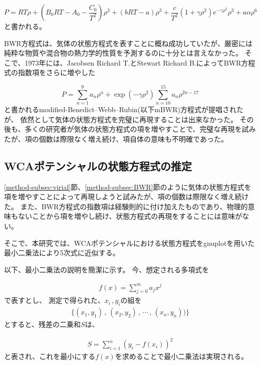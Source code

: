 \documentclass[titlepage]{jsreport}
\begin{document}
{{{\large
\begin{equation}
P=RT{\rho}+\left(B_0RT-A_0-{\frac{C_0}{T^2}}\right){\rho}^2+(bRT-a){\rho}^3+{\frac{c}{T^2}}(1+{\gamma}{\rho}^2)e^{-{\gamma}{\rho}^2}{\rho}^3+a{\alpha}{\rho}^6\label{eq:BWR}
\end{equation}
\normalsize
と書かれる。

BWR方程式は、気体の状態方程式を表すことに概ね成功していたが、厳密には純粋な物質や混合物の熱力学的性質を予測するのに十分とは言えなかった。
そこで、1973年には、Jacobsen Richard T.とStewart Richard B.によってBWR方程式の指数項をさらに増やした

\large
\begin{equation}
P=\sum_{n=1}^9a_n{\rho}^n+\exp(-{\gamma}{\rho}^2)\sum_{n=10}^{15}a_n{\rho}^{2n-17}\label{eq:mBWR}
\end{equation}
\normalsize
と書かれるmodified-Benedict–Webb–Rubin(以下mBWR)方程式が提唱\cite{m-BWR-equation}されたが、
依然として気体の状態方程式を完璧に再現することは出来なかった。
その後も、多くの研究者が気体の状態方程式の項を増やすことで、完璧な再現を試みた\cite{MCCARTY1974276}\cite{BWR-equation:13}\cite{BWR-equation:25}が、項の個数は際限なく増え続け、項自体の意味も不明確であった。

\subsection{WCAポテンシャルの状態方程式の推定}\label{method-subsec:WCA-equation}
\ref{method-subsec:virial}節、\ref{method-subsec:BWR}節のように気体の状態方程式を項を増やすことによって再現しようと試みたが、項の個数は際限なく増え続けた。
また、BWR方程式の指数項は経験則的に付け加えたものであり、物理的意味もないことから項を増やし続け、状態方程式の再現をすることには意味がない。

そこで、本研究では、WCAポテンシャルにおける状態方程式をgnuplot\cite{gnuplot}を用いた最小二乗法により5次式に近似する。

以下、最小二乗法の説明を簡潔に示す。
今、想定される多項式を

\large
\begin{eqnarray}
f(x)=\sum_{j=0}^m a_jx^j \nonumber
\end{eqnarray}
\normalsize
で表すとし、
測定で得られた、$x_i$\,,\,$y_i$の組を
\large
\begin{eqnarray}
\{(x_1,y_1)\,,\,(x_2,y_2)\,,\,\cdots\,,\,(x_n,y_n)) \}\nonumber
\end{eqnarray}
\normalsize
とすると、残差の二乗和$S$は、

\large
\begin{eqnarray}
S=\sum_{i=1}^n (y_i-f(x_i))^2\label{eq:residual-error}
\end{eqnarray}
\normalsize
と表され、これを最小にする$f(x)$を求めることで最小二乗法は実現される。


}}}
\end{document}
